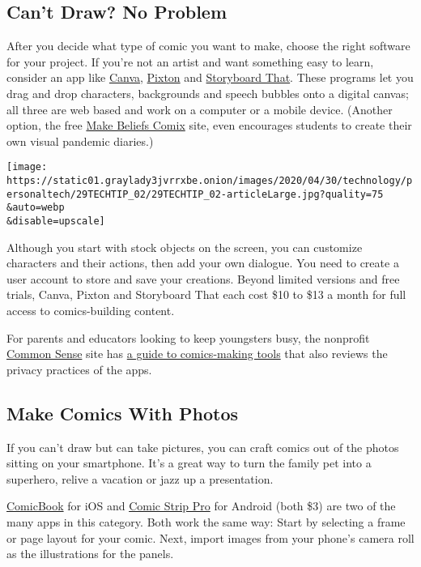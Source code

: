 \hypertarget{cant-draw-no-problem}{%
\subsection{Can't Draw? No Problem}\label{cant-draw-no-problem}}

After you decide what type of comic you want to make, choose the right
software for your project. If you're not an artist and want something
easy to learn, consider an app like
\href{https://www.canva.com/create/comic-strips/}{Canva},
\href{https://www.pixton.com/}{Pixton} and
\href{https://www.storyboardthat.com/storyboard-creator}{Storyboard
That}. These programs let you drag and drop characters, backgrounds and
speech bubbles onto a digital canvas; all three are web based and work
on a computer or a mobile device. (Another option, the free
\href{https://www.makebeliefscomix.com/}{Make Beliefs Comix} site, even
encourages students to create their own visual pandemic diaries.)

\texttt{[image: https://static01.graylady3jvrrxbe.onion/images/2020/04/30/technology/personaltech/29TECHTIP\_02/29TECHTIP\_02-articleLarge.jpg?quality=75\\\&auto=webp\\\&disable=upscale]}

Although you start with stock objects on the screen, you can customize
characters and their actions, then add your own dialogue. You need to
create a user account to store and save your creations. Beyond limited
versions and free trials, Canva, Pixton and Storyboard That each cost
\$10 to \$13 a month for full access to comics-building content.

For parents and educators looking to keep youngsters busy, the nonprofit
\href{https://www.commonsense.org/}{Common Sense} site has
\href{https://www.commonsense.org/education/top-picks/classroom-friendly-websites-and-apps-for-making-comics}{a
guide to comics-making tools} that also reviews the privacy practices of
the apps.

\hypertarget{make-comics-with-photos}{%
\subsection{Make Comics With Photos}\label{make-comics-with-photos}}

If you can't draw but can take pictures, you can craft comics out of the
photos sitting on your smartphone. It's a great way to turn the family
pet into a superhero, relive a vacation or jazz up a presentation.

\href{https://apps.apple.com/us/app/comicbook/id436114747}{ComicBook}
for iOS and
\href{https://play.google.com/store/apps/details?id=com.roundwoodstudios.comicstripitpro\&hl=en}{Comic
Strip Pro} for Android (both \$3) are two of the many apps in this
category. Both work the same way: Start by selecting a frame or page
layout for your comic. Next, import images from your phone's camera roll
as the illustrations for the panels.

